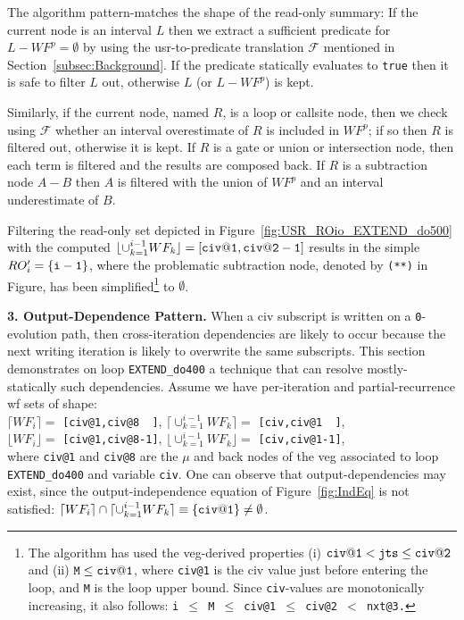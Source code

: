 \documentclass{sig-alternate}
\begin{document}
The algorithm pattern-matches the shape of the read-only summary:
If the current node is an interval $L$ then we extract a %
sufficient predicate for $L - WF^p = \emptyset$ by using the {\sc usr}-to-predicate
translation $\mathcal{F}$ mentioned in Section~\ref{subsec:Background}.   
If the predicate statically evaluates to {\tt true} then it is safe to 
filter $L$ out, otherwise $L$ (or $L-WF^p$) is kept.  

Similarly, if the current node, named $R$, is a loop or callsite node, 
then we check using $\mathcal{F}$ whether an interval overestimate of 
$R$ is included in $WF^p$; if so then $R$ is filtered out, otherwise 
it is kept.  
%
If $R$ is a gate or union or intersection node,
then each term is filtered and the results are composed back. 
%
If $R$ is a subtraction node $A-B$ then $A$ is filtered with the union 
of $WF^p$ and an interval underestimate of $B$. 

Filtering the read-only set depicted in Figure~\ref{fig:USR_ROio_EXTEND_do500}
with the computed $\lfloor \cup_{k=1}^{i-1}WF_k\rfloor={\tt [civ@1,civ@2-1]}$
results in the simple $RO'_{i} = {\tt\{i-1\}}$, where the problematic 
subtraction node, denoted by {\tt (**)} in Figure, has been simplified\footnote{
The algorithm has used the {\sc veg}-derived properties (i) ${\tt civ@1} < {\tt jts} \leq {\tt civ@2}$ 
and (ii) ${\tt M} \leq {\tt civ@1}$, where {\tt civ@1} is the {\sc civ} value 
just before entering the loop, and {\tt M} is the loop upper bound. Since 
{\tt civ}-values are monotonically increasing, it also follows: 
{\tt i $\leq$ M $\leq$ civ@1 $\leq$ civ@2 $<$ nxt@3.}
}
to $\emptyset$.%


\vspace{1ex}

{\bf 3. Output-Dependence Pattern.} 
%
When a {\sc civ} subscript is written on a {\tt 0}-evolution path,
then cross-iteration dependencies are likely to occur because 
the next writing iteration is likely to overwrite the same subscripts.
This section demonstrates on loop {\tt EXTEND\_do400}
a technique that can resolve mostly-statically such dependencies.
%
Assume we have per-iteration and partial-recurrence {\sc wf} 
sets of shape:\vspace{1ex}\\
\noindent$\lceil WF_i\rceil = $ {\tt[civ@1,civ@8~~]},
$\lceil\cup_{k=1}^{i-1}WF_{k} \rceil = $ {\tt[civ,civ@1~~]},\\
\noindent$\lfloor WF_i\rfloor = $ {\tt[civ@1,civ@8-1]},
$\lfloor\cup_{k=1}^{i-1}WF_k \rfloor = $ {\tt[civ,civ@1-1]},\vspace{1ex}\\
where {\tt civ@1} and {\tt civ@8} are the $\mu$ and back nodes of
the {\sc veg} associated to loop {\tt EXTEND\_do400} and variable {\tt civ}.
%
One can observe that output-dependencies may exist, since
the output-independence equation of Figure~\ref{fig:IndEq} is not satisfied:
$\lceil WF_{i}\rceil \cap \lceil \cup_{k=1}^{i-1}WF_{k} \rceil \equiv {\tt\{civ@1\}}\ne\emptyset$.
\end{document}
